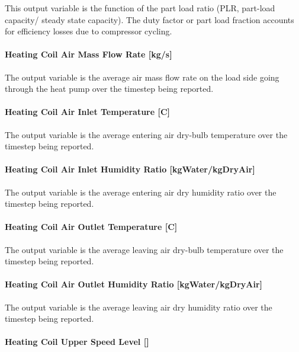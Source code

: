 This output variable is the function of the part load ratio (PLR, part-load capacity/ steady state capacity). The duty factor or part load fraction accounts for efficiency losses due to compressor cycling.

\paragraph{Heating Coil Air Mass Flow Rate {[}kg/s{]}}\label{heating-coil-air-mass-flow-rate-kgs}

The output variable is the average air mass flow rate on the load side going through the heat pump over the timestep being reported.

\paragraph{Heating Coil Air Inlet Temperature {[}C{]}}\label{heating-coil-air-inlet-temperature-c}

The output variable is the average entering air dry-bulb temperature over the timestep being reported.

\paragraph{Heating Coil Air Inlet Humidity Ratio {[}kgWater/kgDryAir{]}}\label{heating-coil-air-inlet-humidity-ratio-kgwaterkgdryair}

The output variable is the average entering air dry humidity ratio over the timestep being reported.

\paragraph{Heating Coil Air Outlet Temperature {[}C{]}}\label{heating-coil-air-outlet-temperature-c}

The output variable is the average leaving air dry-bulb temperature over the timestep being reported.

\paragraph{Heating Coil Air Outlet Humidity Ratio {[}kgWater/kgDryAir{]}}\label{heating-coil-air-outlet-humidity-ratio-kgwaterkgdryair}

The output variable is the average leaving air dry humidity ratio over the timestep being reported.

\paragraph{Heating Coil Upper Speed Level {[]}}\label{heating-coil-upper-speed-level}

